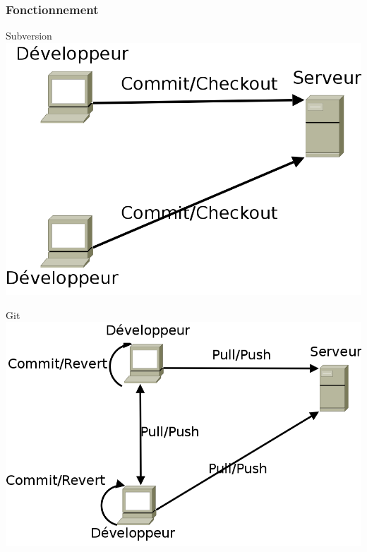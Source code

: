 \begin{frame}\frametitle{Fonctionnement}
\begin{centering}
\begin{minipage}[c]{.5\linewidth}
	\begin{beamerboxesrounded}[shadow=true,center]{Subversion}
		\centering
		\includegraphics[width=\linewidth]{../image/svn.png}
	\end{beamerboxesrounded}
\end{minipage}
\vfill
\begin{minipage}[c]{.5\linewidth}
 	\begin{beamerboxesrounded}[shadow=true,center]{Git}
	\includegraphics[width=\linewidth]{../image/gitSimplifie.png}
 	\end{beamerboxesrounded}
\end{minipage}
\vfill
\end{centering}
\end{frame}
